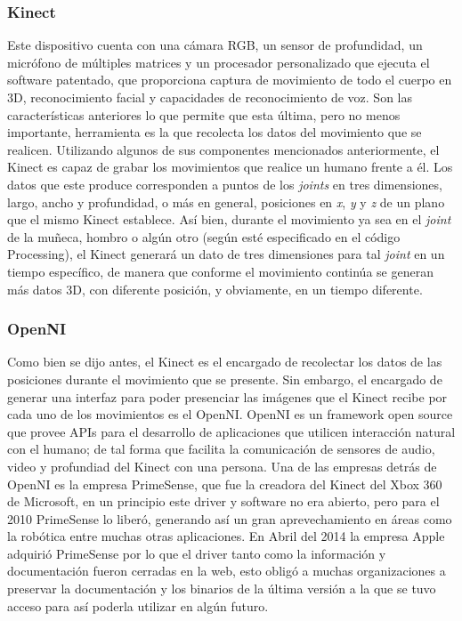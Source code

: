 \documentclass[letterpaper]{article}
\begin{document}
\subsubsection{Kinect}

\quad \quad Este dispositivo cuenta con una cámara RGB, un sensor de profundidad, un micrófono de múltiples matrices y un procesador personalizado que ejecuta el software patentado, que proporciona captura de movimiento de todo el cuerpo en 3D, reconocimiento facial y capacidades de reconocimiento de voz. 
Son las características anteriores lo que permite que esta última, pero no menos importante, herramienta es la que recolecta los datos del movimiento que se realicen. Utilizando algunos de sus componentes mencionados anteriormente, el Kinect es capaz de grabar los movimientos que realice un humano
frente a él. Los datos que este produce corresponden a puntos de los \textit{joints} en tres dimensiones, largo, ancho y profundidad, o más en general, posiciones en \textit{x}, \textit{y} y \textit{z} de un plano que el mismo Kinect establece. Así bien, durante el movimiento ya sea en el \textit{joint} de la muñeca, hombro o algún otro (según esté especificado en el código Processing), 
el Kinect generará un dato de tres dimensiones para tal \textit{joint} en un tiempo específico, de manera que conforme el movimiento continúa se generan más datos 3D, con diferente posición, y obviamente, en un tiempo diferente. 

\subsubsection{OpenNI}

\quad \quad Como bien se dijo antes, el Kinect es el encargado de recolectar los datos de las posiciones durante el movimiento que se presente. Sin embargo, el encargado de generar una interfaz para poder presenciar las imágenes que el Kinect recibe por cada uno de los movimientos es el OpenNI. OpenNI es un framework open source que provee APIs para el desarrollo de aplicaciones que utilicen interacción natural con el humano; de tal forma que facilita la comunicación de sensores de audio,
video y profundiad del Kinect con una persona. Una de las empresas detrás de OpenNI es la empresa PrimeSense, que fue la creadora del Kinect del Xbox 360 de Microsoft, en un principio este driver y software no era abierto, pero para el 2010 PrimeSense lo liberó, generando así un gran aprevechamiento en áreas como la robótica entre muchas otras aplicaciones. En Abril del 2014 la empresa Apple adquirió PrimeSense por lo que el driver tanto como la información y documentación fueron cerradas en la web, esto obligó a muchas organizaciones
a preservar la documentación y los binarios de la última versión a la que se tuvo acceso para así poderla utilizar en algún futuro.
\end{document}
